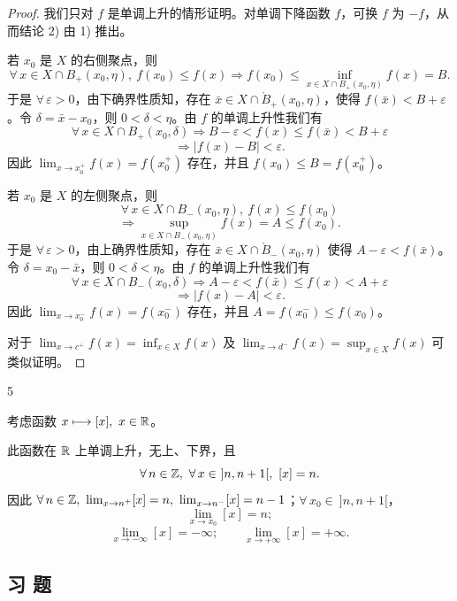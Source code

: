 \begin{proof}

	我们只对 \(f\) 是单调上升的情形证明。对单调下降函数 \(f\)，可换 \(f\) 为 \(-f\)，从而结论 2) 由 1) 推出。

	若 \(x_0\) 是 \(X\) 的右侧聚点，则
	\[
	\forall\,x\in X\cap B_+(x_0,\eta),\ f(x_0)\le f(x)\Longrightarrow f(x_0)\le\inf_{x\in X\cap B_+(x_0,\eta)}f(x)=B.
	\]
	于是 \(\forall\,\varepsilon>0\)，由下确界性质知，存在 \(\bar x\in X\cap\mathring{B}_+(x_0,\eta)\)，使得 \(f(\bar x)<B+\varepsilon\)。令 \(\delta=\bar x-x_0\)，则 \(0<\delta<\eta\)。由 \(f\) 的单调上升性我们有
	\[
	\forall\,x\in X\cap B_+(x_0,\delta)\Longrightarrow B-\varepsilon<f(x)\le f(\bar x)<B+\varepsilon
	\]
	\[
	\Longrightarrow |f(x)-B|<\varepsilon.
	\]
	因此 \(\lim_{x\to x_0^+}f(x)=f(x_0^+)\) 存在，并且 \(f(x_0)\le B=f(x_0^+)\)。

	若 \(x_0\) 是 \(X\) 的左侧聚点，则
	\[
	\forall\,x\in X\cap B_-(x_0,\eta),\ f(x)\le f(x_0)
	\]
	\[
	\Longrightarrow \sup_{x\in X\cap B_-(x_0,\eta)}f(x)=A\le f(x_0).
	\]
	于是 \(\forall\,\varepsilon>0\)，由上确界性质知，存在 \(\bar x\in X\cap\mathring{B}_-(x_0,\eta)\) 使得 \(A-\varepsilon<f(\bar x)\)。令 \(\delta=x_0-\bar x\)，则 \(0<\delta<\eta\)。由 \(f\) 的单调上升性我们有
	\[
	\forall\,x\in X\cap B_-(x_0,\delta)\Longrightarrow A-\varepsilon<f(\bar x)\le f(x)<A+\varepsilon
	\]
	\[
	\Longrightarrow |f(x)-A|<\varepsilon.
	\]
	因此 \(\lim_{x\to x_0^-}f(x)=f(x_0^-)\) 存在，并且 \(A=f(x_0^-)\le f(x_0)\)。

	对于 \(\lim_{x\to c^+}f(x)=\inf_{x\in X}f(x)\) 及 \(\lim_{x\to d^-}f(x)=\sup_{x\in X}f(x)\) 可类似证明。

\end{proof}

\begin{sourceexample}{5}

	考虑函数 \(x\longmapsto[x],\ x\in\R\)。

	此函数在 \(\mathbb{R}\) 上单调上升，无上、下界，且
	\[
	\forall\,n\in\Z,\ \forall\,x\in\ ]n,n+1[,\ [x]=n.
	\]
	因此 \(\forall\,n\in\Z,\ \lim_{x\to n^+}[x]=n,\ \lim_{x\to n^-}[x]=n-1\)；\(\forall\,x_0\in\ ]n,n+1[\)，
	\[
	\lim_{x\to x_0}[x]=n;
	\]
	\[
	\lim_{x\to-\infty}[x]=-\infty;\qquad \lim_{x\to+\infty}[x]=+\infty.
	\]

\end{sourceexample}

\subsection*{习 题}

